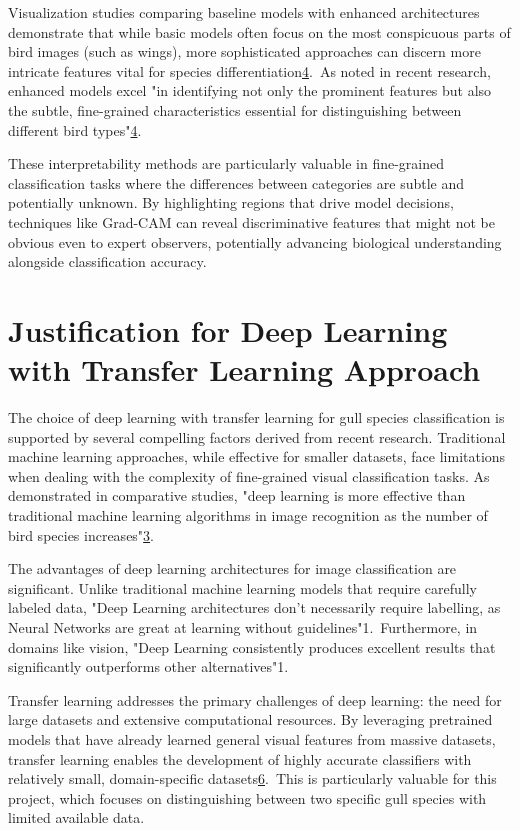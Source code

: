 Visualization studies comparing baseline models with enhanced architectures demonstrate that while basic models often focus on the most conspicuous parts of bird images (such as wings), more sophisticated approaches can discern more intricate features vital for species differentiation\href{https://www.frontiersin.org/journals/neurorobotics/articles/10.3389/fnbot.2024.1391791/full}{4}. As noted in recent research, enhanced models excel "in identifying not only the prominent features but also the subtle, fine-grained characteristics essential for distinguishing between different bird types"\href{https://www.frontiersin.org/journals/neurorobotics/articles/10.3389/fnbot.2024.1391791/full}{4}.

These interpretability methods are particularly valuable in fine-grained classification tasks where the differences between categories are subtle and potentially unknown. By highlighting regions that drive model decisions, techniques like Grad-CAM can reveal discriminative features that might not be obvious even to expert observers, potentially advancing biological understanding alongside classification accuracy.

\section*{Justification for Deep Learning with Transfer Learning Approach}
The choice of deep learning with transfer learning for gull species classification is supported by several compelling factors derived from recent research. Traditional machine learning approaches, while effective for smaller datasets, face limitations when dealing with the complexity of fine-grained visual classification tasks. As demonstrated in comparative studies, "deep learning is more effective than traditional machine learning algorithms in image recognition as the number of bird species increases"\href{https://ijece.iaescore.com/index.php/IJECE/article/view/24833}{3}.

The advantages of deep learning architectures for image classification are significant. Unlike traditional machine learning models that require carefully labeled data, "Deep Learning architectures don't necessarily require labelling, as Neural Networks are great at learning without guidelines"1. Furthermore, in domains like vision, "Deep Learning consistently produces excellent results that significantly outperforms other alternatives"1.

Transfer learning addresses the primary challenges of deep learning: the need for large datasets and extensive computational resources. By leveraging pretrained models that have already learned general visual features from massive datasets, transfer learning enables the development of highly accurate classifiers with relatively small, domain-specific datasets\href{https://arxiv.org/abs/2201.09679}{6}. This is particularly valuable for this project, which focuses on distinguishing between two specific gull species with limited available data.

